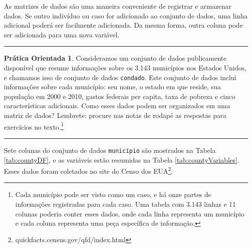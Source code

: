 \documentclass[
]{book}
\theoremstyle{definition}
\theoremstyle{definition}
\theoremstyle{definition}
\newtheorem{exercise}{Prática Orientada}[chapter]
\theoremstyle{definition}
\theoremstyle{remark}
\begin{document}
As matrizes de dados são uma maneira conveniente de registrar e armazenar dados. Se outro indivíduo ou caso for adicionado ao conjunto de dados, uma linha adicional poderá ser facilmente adicionada. Da mesma forma, outra coluna pode ser adicionada para uma nova variável.

\begin{center}\rule{0.5\linewidth}{0.5pt}\end{center}

\begin{exercise}
\protect\hypertarget{exr:unnamed-chunk-3}{}{\label{exr:unnamed-chunk-3} }Consideramos um conjunto de dados publicamente disponível que resume informações sobre os 3.143 municípios nos Estados Unidos, e chamamos isso de conjunto de dados \texttt{condado}. Este conjunto de dados inclui informações sobre cada município: seu nome, o estado em que reside, sua população em 2000 e 2010, gastos federais per capita, taxa de pobreza e cinco características adicionais. Como esses dados podem ser organizados em uma matriz de dados? Lembrete: procure nas notas de rodapé as respostas para exercícios no texto.\footnote{Cada município pode ser visto como um caso, e há onze partes de informações registradas para cada caso. Uma tabela com 3.143 linhas e 11 colunas poderia conter esses dados, onde cada linha representa um município e cada coluna representa uma peça específica de informação.}
\end{exercise}

\begin{center}\rule{0.5\linewidth}{0.5pt}\end{center}

Sete colunas do conjunto de dados \texttt{município} são mostrados na Tabela \ref{tab:countyDF}, e as variáveis estão resumidas na Tabela \ref{tab:countyVariables}. Esses dados foram coletados no site do Censo dos EUA\footnote{quickfacts.census.gov/qfd/index.html}.
\end{document}
